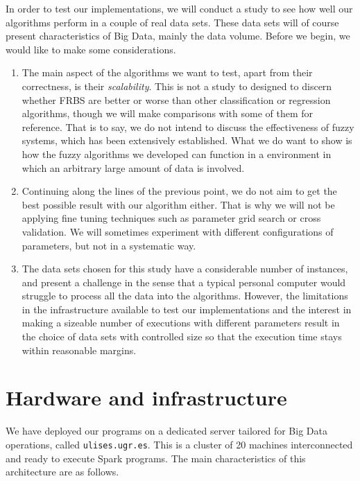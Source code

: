 %
%
%

In order to test our implementations, we will conduct a study to see how well our algorithms perform in a couple of real data sets. These data sets will of course present characteristics of Big Data, mainly the data volume. Before we begin, we would like to make some considerations.

\begin{enumerate}[1.]
  \item The main aspect of the algorithms we want to test, apart from their correctness, is their \textit{scalability}. This is not a study to designed to discern whether FRBS are better or worse than other classification or regression algorithms, though we will make comparisons with some of them for reference. That is to say, we do not intend to discuss the effectiveness of fuzzy systems, which has been extensively established. What we do want to show is how the fuzzy algorithms we developed can function in a environment in which an arbitrary large amount of data is involved.
  \item Continuing along the lines of the previous point, we do not aim to get the best possible result with our algorithm either. That is why we will not be applying fine tuning techniques such as parameter grid search or cross validation. We will sometimes experiment with different configurations of parameters, but not in a systematic way.
  \item The data sets chosen for this study have a considerable number of instances, and present a challenge in the sense that a typical personal computer would struggle to process all the data into the algorithms. However, the limitations in the infrastructure available to test our implementations and the interest in making a sizeable number of executions with different parameters result in the choice of data sets with controlled size so that the execution time stays within reasonable margins.
\end{enumerate}

\section{Hardware and infrastructure}

We have deployed our programs on a dedicated server tailored for Big Data operations, called \verb|ulises.ugr.es|. This is a cluster of 20 machines interconnected and ready to execute Spark programs. The main characteristics of this architecture are as follows.

